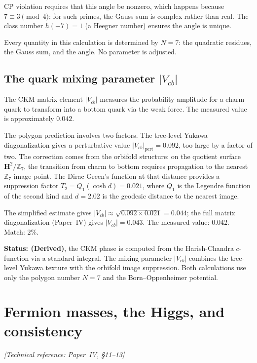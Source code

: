 CP violation requires that this angle be nonzero,
which happens because $7 \equiv 3 \pmod{4}$:
for such primes, the Gauss sum is complex rather than real.
The class number $h(-7) = 1$ (a Heegner number)
ensures the angle is unique.

Every quantity in this calculation is determined by $N = 7$:
the quadratic residues, the Gauss sum, and the angle.
No parameter is adjusted.

\subsection*{The quark mixing parameter $|V_{cb}|$}

The CKM matrix element $|V_{cb}|$ measures the probability amplitude
for a charm quark to transform into a bottom quark via the weak force.
The measured value is approximately $0.042$.

The polygon prediction involves two factors. The tree-level Yukawa
diagonalization gives a perturbative value
$|V_{cb}|_{\text{pert}} = 0.092$, too large by a factor of two.
The correction comes from the orbifold structure: on the quotient
surface $\mathbf{H}^2/\mathbb{Z}_7$, the transition from charm to
bottom requires propagation to the nearest $\mathbb{Z}_7$ image point.
The Dirac Green's function at that distance provides a suppression
factor $T_2 = Q_1(\cosh d) = 0.021$, where $Q_1$ is the Legendre
function of the second kind and $d = 2.02$ is the geodesic distance
to the nearest image.

The simplified estimate gives $|V_{cb}| \approx \sqrt{0.092 \times 0.021} = 0.044$;
the full matrix diagonalization (Paper~IV) gives $|V_{cb}| = 0.043$.
The measured value: $0.042$. Match: $2\%$.

\textbf{Status: (Derived)}, the CKM phase is computed from the
Harish-Chandra $c$-function via a standard integral. The mixing
parameter $|V_{cb}|$ combines the tree-level Yukawa texture with the
orbifold image suppression. Both calculations use only the polygon
number $N = 7$ and the Born--Oppenheimer potential.


\section{Fermion masses, the Higgs, and consistency}
\noindent\textit{[Technical reference: Paper~IV, \S11--13]}

\medskip

